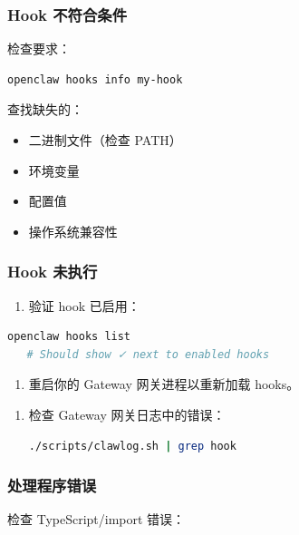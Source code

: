\subsubsection{Hook 不符合条件}


检查要求：

\begin{lstlisting}[language=bash]
openclaw hooks info my-hook
\end{lstlisting}


查找缺失的：

\begin{itemize}
  \item 二进制文件（检查 PATH）
  \item 环境变量
  \item 配置值
  \item 操作系统兼容性
\end{itemize}


\subsubsection{Hook 未执行}


\begin{enumerate}
  \item 验证 hook 已启用：
\end{enumerate}


\begin{lstlisting}[language=bash]
   openclaw hooks list
   # Should show ✓ next to enabled hooks
\end{lstlisting}


\begin{enumerate}
  \item 重启你的 Gateway 网关进程以重新加载 hooks。
\end{enumerate}


\begin{enumerate}
  \item 检查 Gateway 网关日志中的错误：
\begin{lstlisting}[language=bash]
   ./scripts/clawlog.sh | grep hook
\end{lstlisting}

\end{enumerate}


\subsubsection{处理程序错误}


检查 TypeScript/import 错误：

